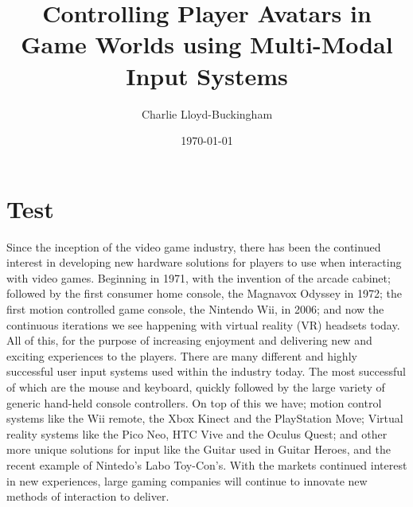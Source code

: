 \documentclass[11pt, a4paper]{article}
\title{Controlling Player Avatars in Game Worlds using Multi-Modal Input Systems}
\author{Charlie Lloyd-Buckingham}
\date{\today}
\begin{document}
\section{Test}
Since the inception of the video game industry, there has been the continued interest in developing new hardware solutions for players to use when interacting with video games. Beginning in 1971, with the invention of the arcade cabinet; followed by the first consumer home console, the Magnavox Odyssey in 1972; the first motion controlled game console, the Nintendo Wii, in 2006; and now the continuous iterations we see happening with virtual reality (VR) headsets today. All of this, for the purpose of increasing enjoyment and delivering new and exciting experiences to the players. There are many different and highly successful user input systems used within the industry today. The most successful of which are the mouse and keyboard, quickly followed by the large variety of generic hand-held console controllers. On top of this we have; motion control systems like the Wii remote, the Xbox Kinect and the PlayStation Move; Virtual reality systems like the Pico Neo, HTC Vive and the Oculus Quest; and other more unique solutions for input like the Guitar used in Guitar Heroes, and the recent example of Nintedo's Labo Toy-Con's. With the markets continued interest in new experiences, large gaming companies will continue to innovate new methods of interaction to deliver.
\end{document}
